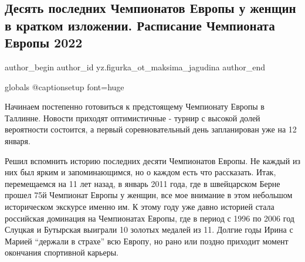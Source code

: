  
 
 
 
 
\subsection{Десять последних Чемпионатов Европы у женщин в кратком изложении. Расписание Чемпионата Европы 2022}
\label{sec:04_01_2022.yz.figurka_ot_maksima_jagudina.1.chempionaty_evropy}


\ifcmt
 author_begin
   author_id yz.figurka_ot_maksima_jagudina
 author_end
\fi

\ifcmt
	globals
	@captionsetup font=huge
\fi

Начинаем постепенно готовиться к предстоящему Чемпионату Европы в Таллинне.
Новости приходят оптимистичные - турнир с высокой долей вероятности состоится,
а первый соревновательный день запланирован уже на 12 января.


Решил вспомнить историю последних десяти Чемпионатов Европы. Не каждый из них
был ярким и запоминающимся, но о каждом есть что рассказать. Итак, перемещаемся
на 11 лет назад, в январь 2011 года, где в швейцарском Берне прошел 75й
Чемпионат Европы у женщин, все мое внимание в этом небольшом историческом
экскурсе именно им. К этому году уже давно историей стала российская доминация
на Чемпионатах Европы, где в период с 1996 по 2006 год Слуцкая и Бутырская
выиграли 10 золотых медалей из 11. Долгие годы Ирина с Марией \enquote{держали в
страхе} всю Европу, но рано или поздно приходит момент окончания спортивной
карьеры.

